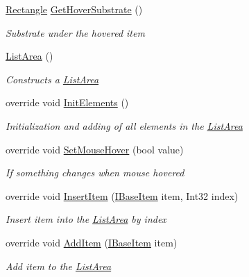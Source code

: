 \begin{DoxyCompactItemize}
\mbox{\hyperlink{class_space_v_i_l_1_1_rectangle}{Rectangle}} \mbox{\hyperlink{class_space_v_i_l_1_1_list_area_af2b6ef18d4cbaea198704bf1d0dac97a}{Get\+Hover\+Substrate}} ()
\begin{DoxyCompactList}\small\item\em Substrate under the hovered item \end{DoxyCompactList}\item 
\mbox{\hyperlink{class_space_v_i_l_1_1_list_area_a9ff09f668b7bbb22943905402aaa5938}{List\+Area}} ()
\begin{DoxyCompactList}\small\item\em Constructs a \mbox{\hyperlink{class_space_v_i_l_1_1_list_area}{List\+Area}} \end{DoxyCompactList}\item 
override void \mbox{\hyperlink{class_space_v_i_l_1_1_list_area_ac60446e61da68f5a73ef6981ac26c9a3}{Init\+Elements}} ()
\begin{DoxyCompactList}\small\item\em Initialization and adding of all elements in the \mbox{\hyperlink{class_space_v_i_l_1_1_list_area}{List\+Area}} \end{DoxyCompactList}\item 
override void \mbox{\hyperlink{class_space_v_i_l_1_1_list_area_a14f2764a6ad13641bf4761f37a5ec2ae}{Set\+Mouse\+Hover}} (bool value)
\begin{DoxyCompactList}\small\item\em If something changes when mouse hovered \end{DoxyCompactList}\item 
override void \mbox{\hyperlink{class_space_v_i_l_1_1_list_area_a44efda800a4a280b7a452bd09c90f484}{Insert\+Item}} (\mbox{\hyperlink{interface_space_v_i_l_1_1_core_1_1_i_base_item}{I\+Base\+Item}} item, Int32 index)
\begin{DoxyCompactList}\small\item\em Insert item into the \mbox{\hyperlink{class_space_v_i_l_1_1_list_area}{List\+Area}} by index \end{DoxyCompactList}\item 
override void \mbox{\hyperlink{class_space_v_i_l_1_1_list_area_a31bfa40ca257cb8d2709f1b0b15fea71}{Add\+Item}} (\mbox{\hyperlink{interface_space_v_i_l_1_1_core_1_1_i_base_item}{I\+Base\+Item}} item)
\begin{DoxyCompactList}\small\item\em Add item to the \mbox{\hyperlink{class_space_v_i_l_1_1_list_area}{List\+Area}} \end{DoxyCompactList}\item 

\end{DoxyCompactItemize}
